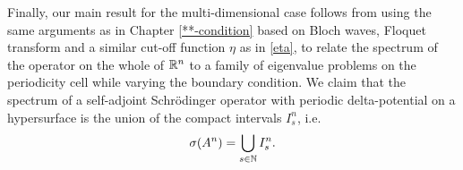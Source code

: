 Finally, our main result for the multi-dimensional case follows from using the same arguments as in Chapter \ref{**-condition} based on Bloch waves, Floquet transform and a similar cut-off function $\eta$ as in \eqref{eta}, to relate the spectrum of the operator on the whole of $\mathbb{R}^{n}$ to a family of eigenvalue problems on the periodicity cell while varying the boundary condition. We claim that the spectrum of a self-adjoint Schrödinger operator with periodic delta-potential on a hypersurface is the union of the compact intervals $I^{n}_{s}$, i.e.
	\[ \sigma(A^{n}) = \bigcup_{s \in \mathbb{N}} I^{n}_{s}. \]